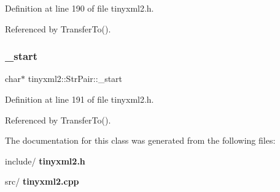 Definition at line 190 of file tinyxml2.\+h.



Referenced by Transfer\+To().

\mbox{\label{classtinyxml2_1_1_str_pair_acfd8687916a02833cc55c279460d2f4a}} 
\subsubsection{\+\_\+start}
{\footnotesize\ttfamily char$\ast$ tinyxml2\+::\+Str\+Pair\+::\+\_\+start\hspace{0.3cm}{\ttfamily [private]}}



Definition at line 191 of file tinyxml2.\+h.



Referenced by Transfer\+To().



The documentation for this class was generated from the following files\+:\begin{DoxyCompactItemize}
\item 
include/\textbf{ tinyxml2.\+h}\item 
src/\textbf{ tinyxml2.\+cpp}\end{DoxyCompactItemize}
